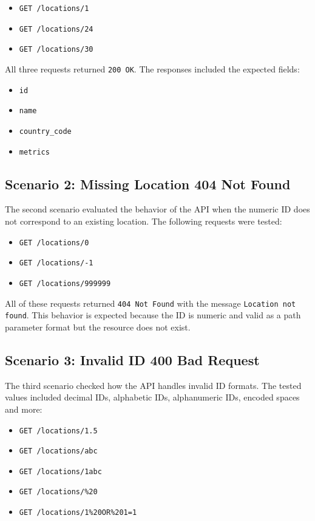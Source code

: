 \begin{itemize}
    \item \texttt{GET /locations/1}
    \item \texttt{GET /locations/24}
    \item \texttt{GET /locations/30}
\end{itemize}

All three requests returned \texttt{200 OK}. The responses included the expected fields:

\begin{itemize}
    \item \texttt{id}
    \item \texttt{name}
    \item \texttt{country\_code}
    \item \texttt{metrics}
\end{itemize}

\subsection{Scenario 2: Missing Location 404 Not Found}

The second scenario evaluated the behavior of the API when the numeric ID does not correspond to an existing location. The following requests were tested:

\begin{itemize}
    \item \texttt{GET /locations/0}
    \item \texttt{GET /locations/-1}
    \item \texttt{GET /locations/999999}
\end{itemize}

All of these requests returned \texttt{404 Not Found} with the message \texttt{Location not found}. This behavior is expected because the ID is numeric and valid as a path parameter format but the resource does not exist.

\subsection{Scenario 3: Invalid ID 400 Bad Request}

The third scenario checked how the API handles invalid ID formats. The tested values included decimal IDs, alphabetic IDs, alphanumeric IDs, encoded spaces and more:

\begin{itemize}
    \item \texttt{GET /locations/1.5}
    \item \texttt{GET /locations/abc}
    \item \texttt{GET /locations/1abc}
    \item \texttt{GET /locations/\%20}
    \item \texttt{GET /locations/1\%20OR\%201=1}
\end{itemize}

